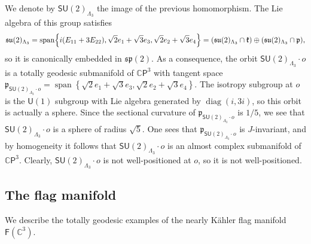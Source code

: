 \documentclass[11pt,a4paper,final]{amsart}
\newcommand{\s}{\mathsf}
\newcommand{\g}{\mathfrak}
\newcommand{\C}{\mathbb{C}}
\newcommand{\vecspan}{\operatorname{span}}
\theoremstyle{definition}
\begin{document}
We denote by $\mathsf{SU}(2)_{\Lambda_{3}}$ the image of the previous homomorphism.
The Lie algebra of this group satisfies
\begin{equation*}
	\g{su}(2)_{\Lambda_{3}}=\vecspan\Bigl\{
		i(E_{11}+3E_{22}),
		\sqrt{2}e_{1}+\sqrt{3}e_{3},
		\sqrt{2}e_{2}+\sqrt{3}e_{4}
	\Bigr\}=(\g{su}(2)_{\Lambda_{3}}\cap \g{k})\oplus (\g{su}(2)_{\Lambda_{3}}\cap \g{p}),
\end{equation*}
so it is canonically embedded in $\g{sp}(2)$.
As a consequence, the orbit $\mathsf{SU}(2)_{\Lambda_{3}}\cdot o$ is a totally geodesic submanifold of $\C\mathsf{P}^{3}$ with tangent space $\g{p}_{\mathsf{SU}(2)_{\Lambda_{3}}\cdot o}=\vecspan\left\{ \sqrt{2}e_{1}+\sqrt{3}e_{3},\sqrt{2}e_{2}+\sqrt{3}e_{4} \right\}$.
The isotropy subgroup at $o$ is the $\mathsf{U}(1)$ subgroup with Lie algebra generated by $\operatorname{diag}(i,3i)$, so this orbit is actually a sphere.
Since the sectional curvature of $\g{p}_{\mathsf{SU}(2)_{\Lambda_{3}}\cdot o}$ is $1/5$, we see that $\mathsf{SU}(2)_{\Lambda_{3}}\cdot o$ is a sphere of radius $\sqrt{5}$.
One sees that $\g{p}_{\mathsf{SU}(2)_{\Lambda_{3}}\cdot o}$ is $J$-invariant, and by homogeneity it follows that $\mathsf{SU}(2)_{\Lambda_{3}}\cdot o$ is an almost complex submanifold of $\C\mathsf{P}^{3}$.
Clearly, $\mathsf{SU}(2)_{\Lambda_{3}}\cdot o$ is not well-positioned at $o$, so it is not well-positioned.
	
\subsection{The flag manifold}\label{subsec:exflag} We describe the totally geodesic examples of the nearly Kähler flag manifold $\s{F}(\C^3)$.
	
\end{document}
